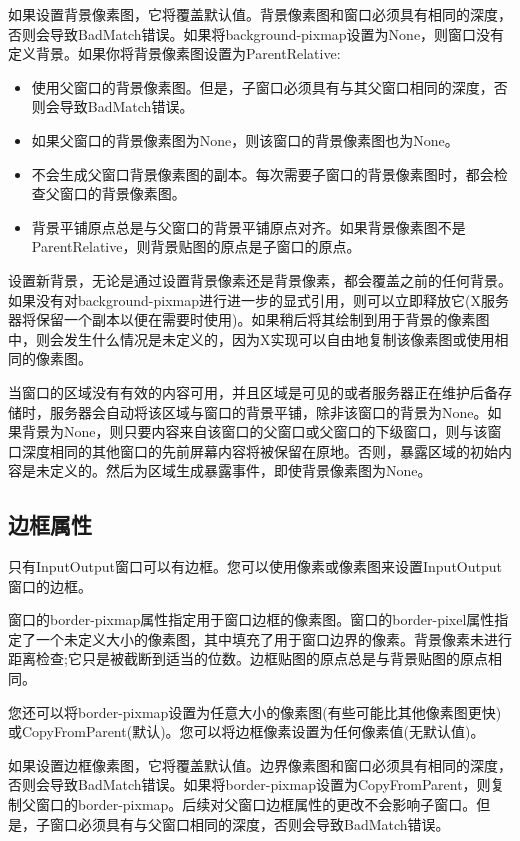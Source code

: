 如果设置背景像素图，它将覆盖默认值。背景像素图和窗口必须具有相同的深度，否则会导致BadMatch错误。如果将background-pixmap设置为None，则窗口没有定义背景。如果你将背景像素图设置为ParentRelative:

\begin{itemize}
	\item 使用父窗口的背景像素图。但是，子窗口必须具有与其父窗口相同的深度，否则会导致BadMatch错误。
	\item 如果父窗口的背景像素图为None，则该窗口的背景像素图也为None。
	\item 不会生成父窗口背景像素图的副本。每次需要子窗口的背景像素图时，都会检查父窗口的背景像素图。
	\item 背景平铺原点总是与父窗口的背景平铺原点对齐。如果背景像素图不是ParentRelative，则背景贴图的原点是子窗口的原点。
\end{itemize}

设置新背景，无论是通过设置背景像素还是背景像素，都会覆盖之前的任何背景。如果没有对background-pixmap进行进一步的显式引用，则可以立即释放它(X服务器将保留一个副本以便在需要时使用)。如果稍后将其绘制到用于背景的像素图中，则会发生什么情况是未定义的，因为X实现可以自由地复制该像素图或使用相同的像素图。

当窗口的区域没有有效的内容可用，并且区域是可见的或者服务器正在维护后备存储时，服务器会自动将该区域与窗口的背景平铺，除非该窗口的背景为None。如果背景为None，则只要内容来自该窗口的父窗口或父窗口的下级窗口，则与该窗口深度相同的其他窗口的先前屏幕内容将被保留在原地。否则，暴露区域的初始内容是未定义的。然后为区域生成暴露事件，即使背景像素图为None。

\subsection{边框属性}

只有InputOutput窗口可以有边框。您可以使用像素或像素图来设置InputOutput窗口的边框。

窗口的border-pixmap属性指定用于窗口边框的像素图。窗口的border-pixel属性指定了一个未定义大小的像素图，其中填充了用于窗口边界的像素。背景像素未进行距离检查;它只是被截断到适当的位数。边框贴图的原点总是与背景贴图的原点相同。

您还可以将border-pixmap设置为任意大小的像素图(有些可能比其他像素图更快)或CopyFromParent(默认)。您可以将边框像素设置为任何像素值(无默认值)。

如果设置边框像素图，它将覆盖默认值。边界像素图和窗口必须具有相同的深度，否则会导致BadMatch错误。如果将border-pixmap设置为CopyFromParent，则复制父窗口的border-pixmap。后续对父窗口边框属性的更改不会影响子窗口。但是，子窗口必须具有与父窗口相同的深度，否则会导致BadMatch错误。

